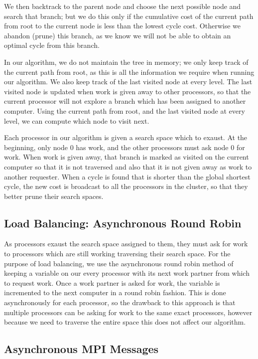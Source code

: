 \documentclass{article}
\begin{document}
We then backtrack to the parent node and choose the next possible node and
search that branch; but we do this only if the cumulative cost of the current
path from root to the current node is less than the lowest cycle cost. 
Otherwise we abandon (prune) this branch, as we know we will not be able to
obtain an optimal cycle from this branch.

In our algorithm, we do not maintain the tree in memory; we only keep track of
the current path from root, as this is all the information we require when
running our algorithm.  We also keep track of the last visited node at every
level.  The last visited node is updated when work is given away to other
processors, so that the current processor will not explore a branch which has
been assigned to another computer.  Using the current path from root, and the
last visited node at every level, we can compute which node to visit next.

Each processor in our algorithm is given a search space which to exaust. At the
beginning, only node 0 has work, and the other processors must ask node 0 for
work.  When work is given away, that branch is marked as visited on the current
computer so that it is not traversed and also that it is not given away as work
to another requester.  When a cycle is found that is shorter than the global
shortest cycle, the new cost is broadcast to all the processors in the cluster,
so that they better prune their search spaces.

\subsection{Load Balancing: Asynchronous Round Robin}

As processors exaust the search space assigned to them, they must ask for work
to processors which are still working traversing their search space.  For the
purpose of load balancing, we use the asynchronous round robin method of keeping
a variable on our every processor with its next work partner from which to
request work.  Once a work partner is asked for work, the variable is
incremented to the next computer in a round robin fashion.  This is done
asynchronously for each processor, so the drawback to this approach is that
multiple processors can be asking for work to the same exact processors, however
because we need to traverse the entire space this does not affect our algorithm.

\subsection{Asynchronous MPI Messages}
\end{document}
